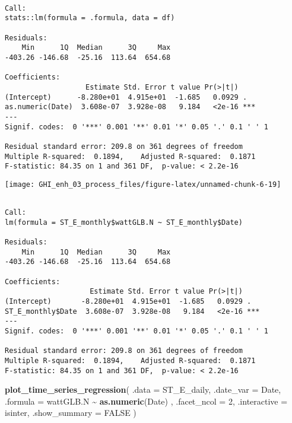 \documentclass[
  10pt,
  a4paper,oneside]{article}
\newenvironment{Shaded}{\begin{snugshade}}{\end{snugshade}}
\newcommand{\AttributeTok}[1]{\textcolor[rgb]{0.13,0.29,0.53}{#1}}
\newcommand{\ConstantTok}[1]{\textcolor[rgb]{0.56,0.35,0.01}{#1}}
\newcommand{\DecValTok}[1]{\textcolor[rgb]{0.00,0.00,0.81}{#1}}
\newcommand{\FunctionTok}[1]{\textcolor[rgb]{0.13,0.29,0.53}{\textbf{#1}}}
\newcommand{\NormalTok}[1]{#1}
\newcommand{\OtherTok}[1]{\textcolor[rgb]{0.56,0.35,0.01}{#1}}
\newcommand{\SpecialCharTok}[1]{\textcolor[rgb]{0.81,0.36,0.00}{\textbf{#1}}}
\begin{document}
\begin{verbatim}

Call:
stats::lm(formula = .formula, data = df)

Residuals:
    Min      1Q  Median      3Q     Max 
-403.26 -146.68  -25.16  113.64  654.68 

Coefficients:
                   Estimate Std. Error t value Pr(>|t|)    
(Intercept)      -8.280e+01  4.915e+01  -1.685   0.0929 .  
as.numeric(Date)  3.608e-07  3.928e-08   9.184   <2e-16 ***
---
Signif. codes:  0 '***' 0.001 '**' 0.01 '*' 0.05 '.' 0.1 ' ' 1

Residual standard error: 209.8 on 361 degrees of freedom
Multiple R-squared:  0.1894,    Adjusted R-squared:  0.1871 
F-statistic: 84.35 on 1 and 361 DF,  p-value: < 2.2e-16
\end{verbatim}

\begin{center}\texttt{[image: GHI\_enh\_03\_process\_files/figure-latex/unnamed-chunk-6-19]} \end{center}

\begin{Shaded}
\end{Shaded}

\begin{verbatim}

Call:
lm(formula = ST_E_monthly$wattGLB.N ~ ST_E_monthly$Date)

Residuals:
    Min      1Q  Median      3Q     Max 
-403.26 -146.68  -25.16  113.64  654.68 

Coefficients:
                    Estimate Std. Error t value Pr(>|t|)    
(Intercept)       -8.280e+01  4.915e+01  -1.685   0.0929 .  
ST_E_monthly$Date  3.608e-07  3.928e-08   9.184   <2e-16 ***
---
Signif. codes:  0 '***' 0.001 '**' 0.01 '*' 0.05 '.' 0.1 ' ' 1

Residual standard error: 209.8 on 361 degrees of freedom
Multiple R-squared:  0.1894,    Adjusted R-squared:  0.1871 
F-statistic: 84.35 on 1 and 361 DF,  p-value: < 2.2e-16
\end{verbatim}

\begin{Shaded}
\begin{Highlighting}[]
\FunctionTok{plot\_time\_series\_regression}\NormalTok{(}
    \AttributeTok{.data         =}\NormalTok{ ST\_E\_daily,}
    \AttributeTok{.date\_var     =}\NormalTok{ Date,}
    \AttributeTok{.formula      =}\NormalTok{ wattGLB.N }\SpecialCharTok{\textasciitilde{}} \FunctionTok{as.numeric}\NormalTok{(Date)  ,}
    \AttributeTok{.facet\_ncol   =} \DecValTok{2}\NormalTok{,}
    \AttributeTok{.interactive  =}\NormalTok{ isinter,}
    \AttributeTok{.show\_summary =} \ConstantTok{FALSE}
\NormalTok{)}
\end{Highlighting}
\end{Shaded}
\end{document}
